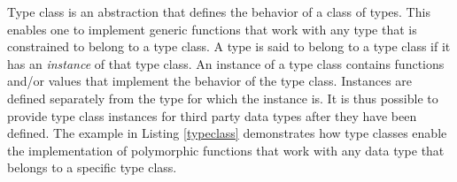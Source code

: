 \documentclass[language=english,version=final,mainfont=none,minted=true]{utuftthesis}
\newcommand{\refsource}[1]{Listing \ref{#1}}
\begin{document}
Type class is an abstraction that defines the behavior of a class of types. This enables one to implement generic functions that work with any type that is constrained to belong to a type class. A type is said to belong to a type class if it has an \emph{instance} of that type class. An instance of a type class contains functions and/or values that implement the behavior of the type class. Instances are defined separately from the type for which the instance is. It is thus possible to provide type class instances for third party data types after they have been defined. The example in \refsource{typeclass} demonstrates how type classes enable the implementation of polymorphic functions that work with any data type that belongs to a specific type class.


\end{document}
